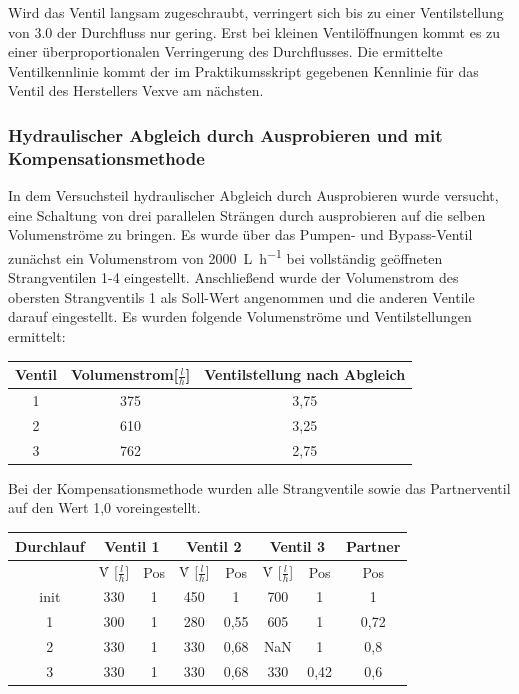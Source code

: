 Wird das Ventil langsam zugeschraubt, verringert sich bis zu einer Ventilstellung von \num{3,0} der Durchfluss nur gering. Erst bei kleinen Ventilöffnungen kommt es zu einer überproportionalen Verringerung des Durchflusses. Die ermittelte Ventilkennlinie kommt der im Praktikumsskript gegebenen Kennlinie für das Ventil des Herstellers Vexve am nächsten. 

\subsubsection{Hydraulischer Abgleich durch Ausprobieren und mit Kompensationsmethode }

In dem Versuchsteil hydraulischer Abgleich durch Ausprobieren wurde versucht, eine Schaltung von drei parallelen Strängen durch ausprobieren auf die selben Volumenströme zu bringen. Es wurde über das Pumpen- und Bypass-Ventil zunächst ein Volumenstrom von \SI{2000}{\liter\per\hour} bei vollständig geöffneten Strangventilen 1-4 eingestellt. Anschließend wurde der Volumenstrom des obersten Strangventils 1 als Soll-Wert angenommen und die anderen Ventile darauf eingestellt. Es wurden folgende Volumenströme und Ventilstellungen ermittelt:

\begin{center}
	\begin{tabular}{c|c|c}
		\label{tab:ausprobieren}
		
		\textbf{Ventil} & \textbf{Volumenstrom}[$\frac{l}{h}$] & \textbf{Ventilstellung nach Abgleich}\\
		\hline
		1 & 375 & 3,75\\
		2 & 610 & 3,25\\
		3 & 762 & 2,75
	\end{tabular}
\end{center}

Bei der Kompensationsmethode wurden alle Strangventile sowie das Partnerventil auf den Wert 1,0 voreingestellt. 

\begin{center}
	\begin{tabular}{c|c|c|c|c|c|c|c}
		\label{tab:komp}
		
		\textbf{Durchlauf} & \multicolumn{2}{c}{\textbf{Ventil 1}} & \multicolumn{2}{c}{\textbf{Ventil 2}} & \multicolumn{2}{c}{\textbf{Ventil 3}} & \textbf{Partner}\\
		\hline
		& \.V [$\frac{l}{h}$] & Pos & \.V [$\frac{l}{h}$] & Pos & \.V [$\frac{l}{h}$] & Pos & Pos\\
		\hline
		init & 330 & 1 & 450 & 1 & 700 & 1 & 1\\
		1 & 300 & 1 & 280 & 0,55 & 605 & 1 & 0,72\\
		2 & 330 & 1 & 330 & 0,68 & NaN & 1 & 0,8\\
		3 & 330 & 1 & 330 & 0,68 & 330 & 0,42 & 0,6
	
	\end{tabular}
\end{center}

